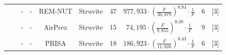 \documentclass[]{elsarticle}
\begin{document}
\begin{table}
{\begin{threeparttable}
\begin{tabular}{@{}cccccccccc@{}}
				&                                                                                                                                                         & -                                                                               & -                                     & REM-NUT                                                                                  & Struvite                                                                          & 47                                                                                    & $977,933 \cdot \left( \frac{F}{30,879} \right)^{0.94} \cdot \frac{1}{F}$                                 & 6                                                            &   [3]       \\
				&                                                                                                                                                         & -                                                                               & -                                     & AirPrex                                                                                  & Struvite                                                                          & 15                                                                                    & $74,195 \cdot \left( \frac{F}{9,855} \right)^{0.38} \cdot \frac{1}{F}$                                  & 9                                                            &     [3]     \\
				&                                                                                                                                                         & -                                                                               & -                                     & PRISA                                                                                    & Struvite                                                                          & 18                                                                                    & $186,923 \cdot \left( \frac{F}{11,826} \right)^{0.43} \cdot \frac{1}{F}$                                  & 6                                                            &     [3]     \\ \cmidrule(l){2-10}

\end{tabular}
\end{threeparttable}}
\end{table}
\end{document}
